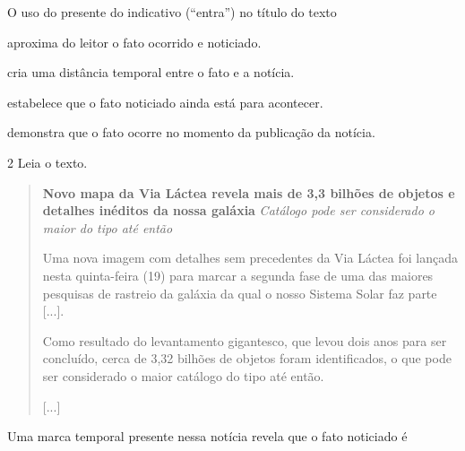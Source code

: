 O uso do presente do indicativo (“entra”) no título do texto

\begin{escolha}
\item aproxima do leitor o fato ocorrido e noticiado.

\item cria uma distância temporal entre o fato e a notícia.

\item estabelece que o fato noticiado ainda está para acontecer.

\item demonstra que o fato ocorre no momento da publicação da notícia.
\end{escolha}




\num{2} Leia o texto.

\begin{quote}
\textbf{Novo mapa da Via Láctea revela mais de 3,3 bilhões de objetos e
detalhes inéditos da nossa galáxia}
\textit{Catálogo pode ser considerado o maior do tipo até então}

Uma nova imagem com detalhes sem precedentes da Via Láctea foi lançada
nesta quinta-feira (19) para marcar a segunda fase de uma das maiores
pesquisas de rastreio da galáxia da qual o nosso Sistema Solar faz parte
{[}...{]}.

Como resultado do levantamento gigantesco, que levou dois anos para ser
concluído, cerca de 3,32 bilhões de objetos foram identificados, o que
pode ser considerado o maior catálogo do tipo até então.

{[}...{]}
\end{quote}

Uma marca temporal presente nessa notícia revela que o fato noticiado é


